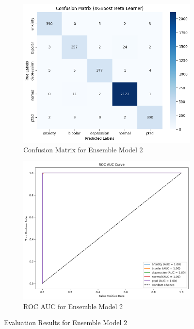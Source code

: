 \begin{figure}[h!]
    \centering
    \begin{subfigure}[b]{0.49\textwidth}
        \centering
        \includegraphics[width=\textwidth]{Images/EM2 CM.png}
        \caption{Confusion Matrix for Ensemble Model 2}
        \label{em2 cm}  %
    \end{subfigure}
    \hfill
    \begin{subfigure}[b]{0.49\textwidth}
        \centering
        \includegraphics[width=\textwidth]{Images/EM2 ROC.png}
        \caption{ROC AUC for Ensemble Model 2}
        \label{em2 roc}  %
    \end{subfigure}
    \caption{Evaluation Results for Ensemble Model 2}
    \label{fig:ensemble_model2_comparison}
\end{figure}


